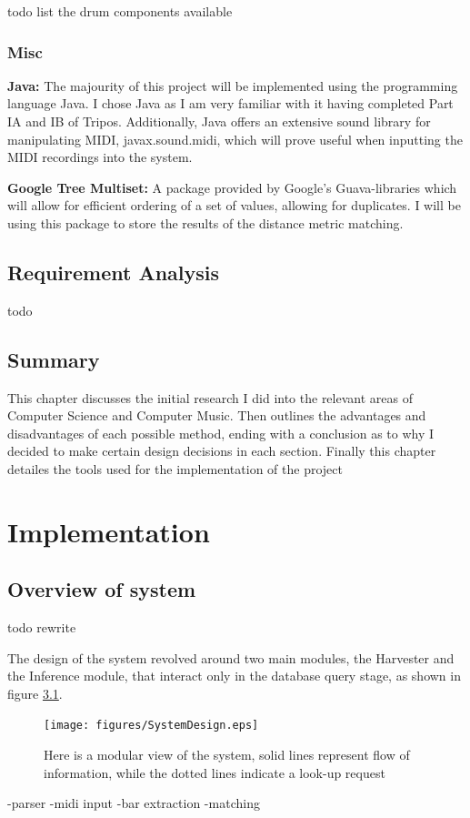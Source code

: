 \documentclass[12pt,twoside,notitlepage]{report}
\begin{document}
			
			
			todo list the drum components available
			
		\subsection{Misc}\label{subsec:tools used: misc}

		\textbf{Java:} The majourity of this project will be implemented using the programming language Java. I chose Java as I am very familiar with it having completed Part IA and IB of Tripos. Additionally, Java offers an extensive sound library for manipulating MIDI, javax.sound.midi, which will prove useful when inputting the MIDI recordings into the system.
		
		\textbf{Google Tree Multiset:}	A package provided by Google's Guava-libraries which will allow for efficient ordering of a set of values, allowing for duplicates. I will be using this package to store the results of the distance metric matching.

		
	\section{Requirement Analysis}
	todo
	\section{Summary}
	This chapter discusses the initial research I did into the relevant areas of Computer Science and Computer Music. Then outlines the advantages and disadvantages of each possible method, ending with a conclusion as to why I decided to make certain design decisions in each section. Finally this chapter detailes the tools used for the implementation of the project
\cleardoublepage
\chapter{Implementation}
	\section{Overview of system}	
	todo rewrite
	
	The design of the system revolved around two main modules, the Harvester and the Inference module, that interact only in the database query stage, as shown in figure \ref{SystemDesign}. 
	
	\begin{figure}[h]
			\centerline{\texttt{[image: figures/SystemDesign.eps]}}
			\caption{\label{SystemDesign} Here is a modular view of the system, solid lines represent flow of information, while the dotted lines indicate a look-up request}
\end{figure}
	-parser
	-midi input
	-bar extraction
	-matching
	
\end{document}
